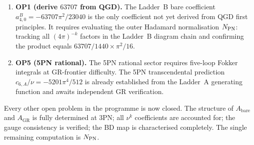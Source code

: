 \documentclass[11pt,a4paper]{article}
\theoremstyle{plain}
\theoremstyle{definition}
\theoremstyle{remark}
\newcommand{\GR}{\mathrm{GR}}
\newcommand{\bare}{\mathrm{bare}}
\begin{document}
\begin{enumerate}[nosep]
\item \textbf{OP1 (derive $63707$ from QGD).}  The Ladder~B bare coefficient
  $a_{4,0}^B = -63707\pi^2/23040$ is the only coefficient not yet derived from
  QGD first principles.  It requires evaluating the outer Hadamard normalisation
  $N_{\rm PN}$: tracking all $(4\pi)^{-k}$ factors in the Ladder~B diagram chain
  and confirming the product equals $63707/1440 \times \pi^2/16$.

\item \textbf{OP5 (5PN rational).}  The 5PN rational sector requires five-loop
  Fokker integrals at GR-frontier difficulty.  The 5PN transcendental prediction
  $c_{6,A}/\nu = -5201\pi^4/512$ is already established from the Ladder~A
  generating function and awaits independent GR verification.
\end{enumerate}

Every other open problem in the programme is now closed.  The structure of
$A_\bare$ and $A_\GR$ is fully determined at 3PN; all $\nu^k$ coefficients
are accounted for; the gauge consistency is verified; the BD map is
characterised completely.  The single remaining computation is $N_{\rm PN}$.
\end{document}
